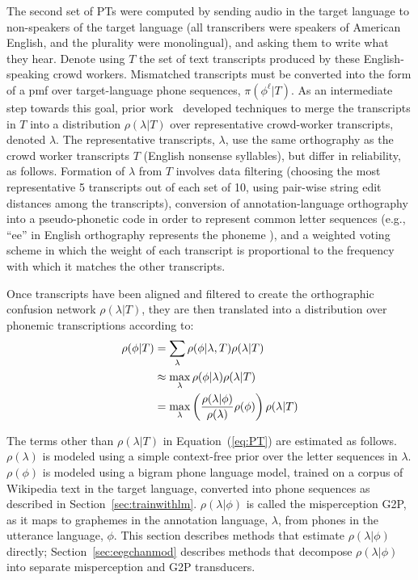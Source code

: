 The second set of PTs were computed by sending audio in the target
language to non-speakers of the target language (all transcribers were
speakers of American English, and the plurality were monolingual), and
asking them to write what they hear.  Denote using $T$ the set of text
transcripts produced by these English-speaking crowd workers.
Mismatched transcripts must be converted into the form of a pmf over
target-language phone sequences, $\pi(\phi^\ell|T)$.  As an
intermediate step towards this goal, prior work~\cite{JHJ15b}
developed techniques to merge the transcripts in $T$ into a
distribution $\rho(\lambda|T)$ over representative crowd-worker
transcripts, denoted $\lambda$.  The representative transcripts,
$\lambda$, use the same orthography as the crowd worker transcripts
$T$ (English nonsense syllables), but differ in reliability, as
follows.  Formation of $\lambda$ from $T$ involves data filtering
(choosing the most representative 5 transcripts out of each set of 10,
using pair-wise string edit distances among the transcripts),
conversion of annotation-language orthography into a pseudo-phonetic
code in order to represent common letter sequences (e.g., ``ee'' in
English orthography represents the phoneme ), and a weighted
voting scheme in which the weight of each transcript is proportional
to the frequency with which it matches the other transcripts.

Once transcripts have been aligned and filtered to create the
orthographic confusion network $\rho(\lambda|T)$, they are then
translated into a distribution over phonemic transcriptions according
to:
\begin{align}
  \rho(\phi|T) &=
  \sum_{\lambda} \rho(\phi|\lambda,T) \rho(\lambda|T) \notag \\
  &\approx \max_{\lambda}  \rho(\phi|\lambda) \rho(\lambda|T) \notag \\
  &= \max_{\lambda}  \left(\frac{\rho(\lambda|\phi)}{\rho(\lambda)}
  \rho(\phi)\right) \rho(\lambda|T) 
\label{eq:PT}
\end{align}

The terms other than $\rho(\lambda|T)$ in Equation~(\ref{eq:PT}) are
estimated as follows.  $\rho(\lambda)$ is modeled using a simple
context-free prior over the letter sequences in $\lambda$.
$\rho(\phi)$ is modeled using a bigram phone language model, trained
on a corpus of Wikipedia text in the target language, converted into
phone sequences as described in Section~\ref{sec:trainwithlm}.
$\rho(\lambda|\phi)$ is called the misperception G2P, as it maps to
graphemes in the annotation language, $\lambda$, from phones in the
utterance language, $\phi$.  This section describes methods that 
estimate $\rho(\lambda|\phi)$ directly; Section~\ref{sec:eegchanmod} 
describes methods that decompose $\rho(\lambda|\phi)$ 
into separate misperception and G2P transducers.

